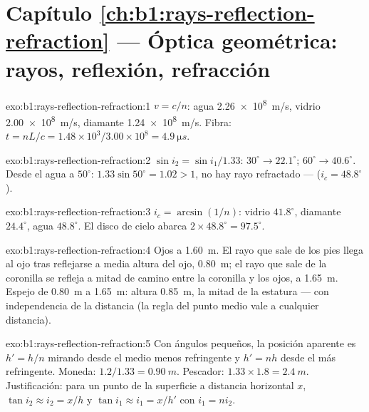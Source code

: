 \section*{Capítulo \ref{ch:b1:rays-reflection-refraction} --- Óptica geométrica: rayos, reflexión, refracción}

\begin{solution}{exo:b1:rays-reflection-refraction:1}
$v = c/n$: agua \qty{2.26e8}{m/s}, vidrio \qty{2.00e8}{m/s}, diamante
\qty{1.24e8}{m/s}. Fibra: $t = nL/c = 1.48 \times 10^3/3.00\times10^8 =
\qty{4.9}{\micro s}$.
\end{solution}

\begin{solution}{exo:b1:rays-reflection-refraction:2}
$\sin i_2 = \sin i_1/1.33$: $30^\circ \to 22.1^\circ$; $60^\circ \to
40.6^\circ$. Desde el agua a $50^\circ$: $1.33\sin 50^\circ = 1.02 > 1$,
no hay rayo refractado ---  ($i_c = 48.8^\circ$).
\end{solution}

\begin{solution}{exo:b1:rays-reflection-refraction:3}
$i_c = \arcsin(1/n)$: vidrio $41.8^\circ$, diamante $24.4^\circ$, agua
$48.8^\circ$. El disco de cielo abarca $2 \times 48.8^\circ = 97.5^\circ$.
\end{solution}

\begin{solution}{exo:b1:rays-reflection-refraction:4}
Ojos a \qty{1.60}{m}. El rayo que sale de los pies llega al ojo tras
reflejarse a media altura del ojo, \qty{0.80}{m}; el rayo que sale de la
coronilla se refleja a mitad de camino entre la coronilla y los ojos, a
\qty{1.65}{m}. Espejo de \qty{0.80}{m} a \qty{1.65}{m}: altura
\qty{0.85}{m}, la mitad de la estatura --- con independencia de la
distancia (la regla del punto medio vale a cualquier distancia).
\end{solution}

\begin{solution}{exo:b1:rays-reflection-refraction:5}
Con ángulos pequeños, la posición aparente es $h' = h/n$ mirando desde el
medio menos refringente y $h' = nh$ desde el más refringente. Moneda: $1.2/1.33 =
\qty{0.90}{m}$. Pescador: $1.33 \times 1.8 = \qty{2.4}{m}$. Justificación:
para un punto de la superficie a distancia horizontal $x$, $\tan i_2 \approx i_2 =
x/h$ y $\tan i_1 \approx i_1 = x/h'$ con $i_1 = n i_2$.
\end{solution}


